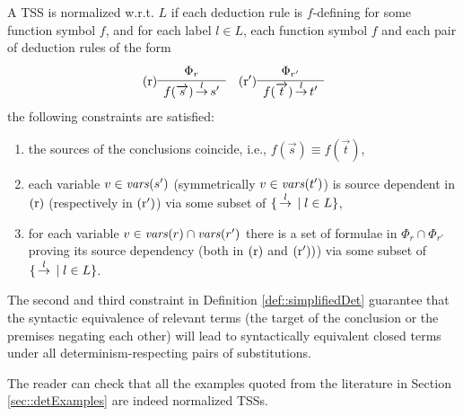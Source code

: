 \begin{definition}\label{def::normalized}
A TSS is normalized w.r.t. $L$ if each deduction rule is $f$-defining for some function symbol $f$, and for each label $l \in L$, each function symbol $f$ and each pair of deduction rules of the form
\[
\DR{r} \sosrule{\Phi_r}{f(\overrightarrow{s}) \trans{l} s'} \quad
\DR{r'} \sosrule{\Phi_{r'}}{f(\overrightarrow{t}) \trans{l} t'}
\]
the following constraints are satisfied:
\begin{enumerate}
\item the sources of the conclusions coincide, i.e., $f(\overrightarrow{s}) \equiv f(\overrightarrow{t})$,
\item each variable $v \in \mathit{vars}(s')$ (symmetrically $v \in \mathit{vars}(t')$) is source dependent in $\mathrm{(r)}$ (respectively in $\mathrm{(r')}$) via some subset of $\{ \,{\stackrel{{l}}{\rightarrow}}\, \mid l \in L\}$,

\item for each variable $v \in \mathit{vars}(r) \cap \mathit{vars}(r')$ there is a set of formulae in $\Phi_r \cap \Phi_{r'}$ proving its source dependency (both in $\mathrm{(r)}$ and $\mathrm{(r')})$) via some subset of $\{ \,{\stackrel{{l}}{\rightarrow}}\, \mid l \in L\}$.
\end{enumerate}
\end{definition}

The second and third constraint in Definition \ref{def::simplifiedDet} guarantee that
the syntactic equivalence of relevant terms (the target of the conclusion or the premises negating each other)
will lead to syntactically equivalent closed terms under all determinism-respecting pairs of substitutions.



%
%
The reader can check that all the examples quoted from the literature in Section \ref{sec::detExamples} are indeed normalized TSSs.


